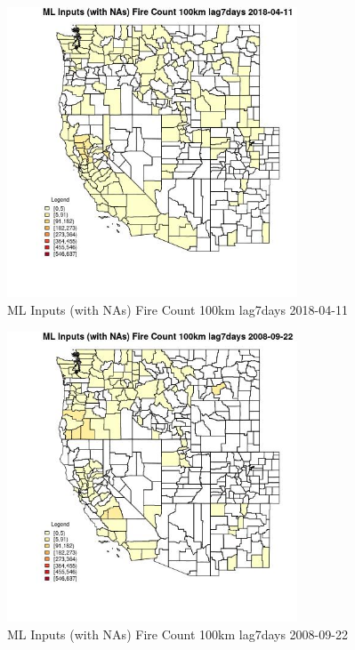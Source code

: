 \begin{figure} 
\centering  
\includegraphics[width=0.77\textwidth]{Code_Outputs/Report_ML_input_PM25_Step4_part_e_de_duplicated_aves_compiled_2019-05-18wNAs_CountyFire_Count_100km_lag7daysMean2018-04-11.jpg} 
\caption{\label{fig:Report_ML_input_PM25_Step4_part_e_de_duplicated_aves_compiled_2019-05-18wNAsCountyFire_Count_100km_lag7daysMean2018-04-11}ML Inputs (with NAs) Fire Count 100km lag7days 2018-04-11} 
\end{figure} 
 

\begin{figure} 
\centering  
\includegraphics[width=0.77\textwidth]{Code_Outputs/Report_ML_input_PM25_Step4_part_e_de_duplicated_aves_compiled_2019-05-18wNAs_CountyFire_Count_100km_lag7daysMean2008-09-22.jpg} 
\caption{\label{fig:Report_ML_input_PM25_Step4_part_e_de_duplicated_aves_compiled_2019-05-18wNAsCountyFire_Count_100km_lag7daysMean2008-09-22}ML Inputs (with NAs) Fire Count 100km lag7days 2008-09-22} 
\end{figure} 
 


